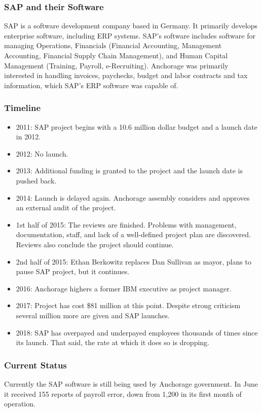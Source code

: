 \documentclass{article}
\begin{document}
  \subsubsection{SAP and their Software}
    SAP is a software development company based in Germany. It primarily develops enterprise software,
    including ERP systems. SAP's software includes software for managing Operations,
    Financials (Financial Accounting, Management Accounting, Financial Supply Chain Management), and
    Human Capital Management (Training, Payroll, e-Recruiting). Anchorage was primarily interested in
    handling invoices, paychecks, budget and labor contracts and tax information, which SAP's ERP software was capable of.
  \subsubsection{Timeline}
  \begin{itemize}
    \item 2011: SAP project begins with a 10.6 million dollar budget and a launch date in 2012.
    \item 2012: No launch.
    \item 2013: Additional funding is granted to the project and the launch date is pushed back.
    \item 2014: Launch is delayed again. Anchorage assembly considers and approves an external audit of the project.
    \item 1st half of 2015: The reviews are finished. Problems with management, documentation, staff, and lack of a well-defined project plan are discovered.
                Reviews also conclude the project should continue.
    \item 2nd half of 2015: Ethan Berkowitz replaces Dan Sullivan as mayor, plans to pause SAP project, but it continues.
    \item 2016: Anchorage highers a former IBM executive as project manager.
    \item 2017: Project has cost \$81 million at this point. Despite strong criticism several million more are given and SAP launches.
    \item 2018: SAP has overpayed and underpayed employees thousands of times since its launch. That said, the rate at which it does so is dropping.
  \end{itemize}
  \subsubsection{Current Status}
    Currently the SAP software is still being used by Anchorage government. In June it received 155 reports of payroll
    error, down from 1,200 in its first month of operation.
\end{document}
